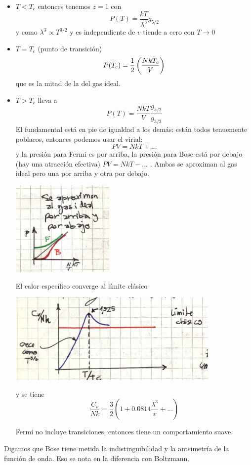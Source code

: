 \documentclass[10pt,oneside]{CBFT_book}
\begin{document}
\begin{itemize}
 \item $ T < T_c $ entonces tenemos $ z=1 $ con
 \[
	P(T) = \frac{kT}{\lambda^3} g_{5/2}
 \]
 y como $ \lambda^3 \propto T^{3/2}$ y es independiente de $v$ tiende a cero con $ T \to 0 $
 \item $ T = T_c $ (punto de transición)
 \[
	P(T_c) = \frac{1}{2} \left( \frac{  N k T_c  }{  V  } \right)
 \]
 que es la mitad de la del gas ideal.
 \item $ T > T_c $ lleva a 
 \[
	P(T) = \frac{NkT}{V} \frac{ g_{5/2} }{ g_{3/2} }
 \]
 El fundamental está en pie de igualdad a los demás: están todos tenuemente poblacos, entonces
 podemos usar el virial:
 \[
	P V = NkT + ...
 \]
 y la presión para Fermi es por arriba, la presión para Bose está por debajo (hay una atracción
 efectiva) $ P V = NkT - ... $ . Ambas se aproximan al gas ideal pero una por arriba y otra por debajo.
 
 \includegraphics[scale=0.5]{images/1606329532.jpg}
 
 El calor específico converge al límite clásico
 
 \includegraphics[scale=0.5]{images/1606329535.jpg}
 
 y se tiene 
 \[
	\frac{ C_v }{ N k } = \frac{ 3 }{ 2 } \left( 1 + 0.0814 \frac{ \lambda^3 }{ v } + ... \right)
 \]
 
 Fermi no incluye transiciones, entonces tiene un comportamiento suave.
 
\end{itemize}

Digamos que Bose tiene metida la indistinguibilidad y la antsimetría de la función de onda.
Eso se nota en la diferencia con Boltzmann.
\end{document}
